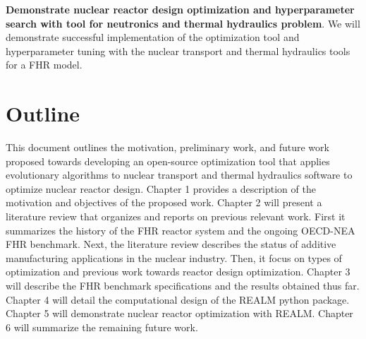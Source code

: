 \vspace{0.2cm} 
\noindent
\textbf{Demonstrate nuclear reactor design optimization and hyperparameter 
search with tool for neutronics and thermal hydraulics problem}.
We will demonstrate successful implementation of the optimization tool and 
hyperparameter tuning with the nuclear transport and thermal hydraulics tools 
for a \gls{FHR} model.  


\section{Outline}
This document outlines the motivation, preliminary work, and future work proposed 
towards developing an open-source optimization tool that applies evolutionary 
algorithms to nuclear transport and thermal hydraulics software to optimize 
nuclear reactor design. 
Chapter 1 provides a description of the motivation and objectives of the 
proposed work. 
Chapter 2 will present a literature review that organizes and reports on previous 
relevant work. 
First it summarizes the history of the \gls{FHR} reactor system and the ongoing 
\gls{OECD}-\gls{NEA} \gls{FHR} benchmark. 
Next, the literature review describes the status of additive manufacturing 
applications in the nuclear industry. 
Then, it focus on types of optimization and previous work towards reactor design
optimization. 
Chapter 3 will describe the \gls{FHR} benchmark specifications and the results 
obtained thus far. 
Chapter 4 will detail the computational design of the REALM python package. 
Chapter 5 will demonstrate nuclear reactor optimization with REALM. 
Chapter 6 will summarize the remaining future work. 
